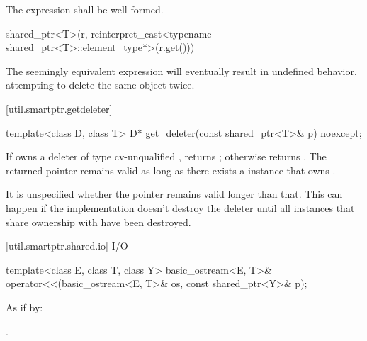 \begin{itemdescr}
\pnum
\requires The expression 
shall be well-formed.

\pnum\returns
\begin{codeblock}
shared_ptr<T>(r, reinterpret_cast<typename shared_ptr<T>::element_type*>(r.get()))
\end{codeblock}

\pnum
\begin{note}
The seemingly equivalent expression
 will eventually result in
undefined behavior, attempting to delete the same object twice.
\end{note}
\end{itemdescr}

[util.smartptr.getdeleter]{}

%
\begin{itemdecl}
template<class D, class T>
  D* get_deleter(const shared_ptr<T>& p) noexcept;
\end{itemdecl}

\begin{itemdescr}
\pnum\returns  If  owns a deleter  of type cv-unqualified
, returns ; otherwise returns .
The returned
pointer remains valid as long as there exists a  instance
that owns . \begin{note} It is unspecified whether the pointer
remains valid longer than that. This can happen if the implementation doesn't destroy
the deleter until all  instances that share ownership with
 have been destroyed. \end{note}
\end{itemdescr}

[util.smartptr.shared.io]{ I/O}

%
\begin{itemdecl}
template<class E, class T, class Y>
  basic_ostream<E, T>& operator<<(basic_ostream<E, T>& os, const shared_ptr<Y>& p);
\end{itemdecl}

\begin{itemdescr}
\pnum\effects As if by: 

\pnum\returns  {}.
\end{itemdescr}

